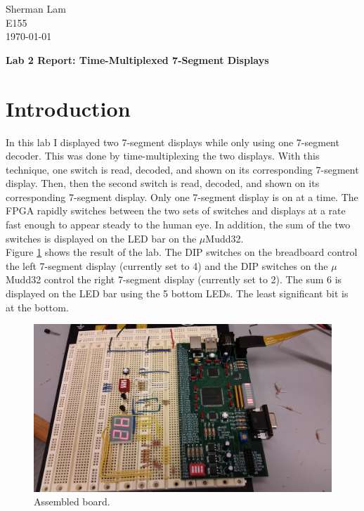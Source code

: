 \documentclass[11pt]{article}
\begin{document}
\begin{flushleft}
Sherman Lam
\\E155
\\ \today
\end{flushleft}


\begin{center}
\begin{Large}
\textbf{Lab 2 Report: Time-Multiplexed 7-Segment Displays}
\end{Large}
\end{center}




\section{Introduction}
\label{sec:intro}

In this lab I displayed two 7-segment displays while only using one 7-segment decoder. This was done by time-multiplexing the two displays. With this technique, one switch is read, decoded, and shown on its corresponding 7-segment display. Then, then the second switch is read, decoded, and shown on its corresponding 7-segment display. Only one 7-segment display is on at a time. The FPGA rapidly switches between the two sets of switches and displays at a rate fast enough to appear steady to the human eye. In addition, the sum of the two switches is displayed on the LED bar on the $\mu$Mudd32. \\

Figure \ref{fig:board} shows the result of the lab. The DIP switches on the breadboard control the left 7-segment display (currently set to 4) and the DIP switches on the $\mu$Mudd32 control the right 7-segment display (currently set to 2). The sum 6 is displayed on the LED bar using the 5 bottom LEDs. The least significant bit is at the bottom. 

\begin{figure}[h!]
\centering
\includegraphics[scale=0.11]{board.jpg}
\caption{Assembled board.}
\label{fig:board}
\end{figure} 
\end{document}
